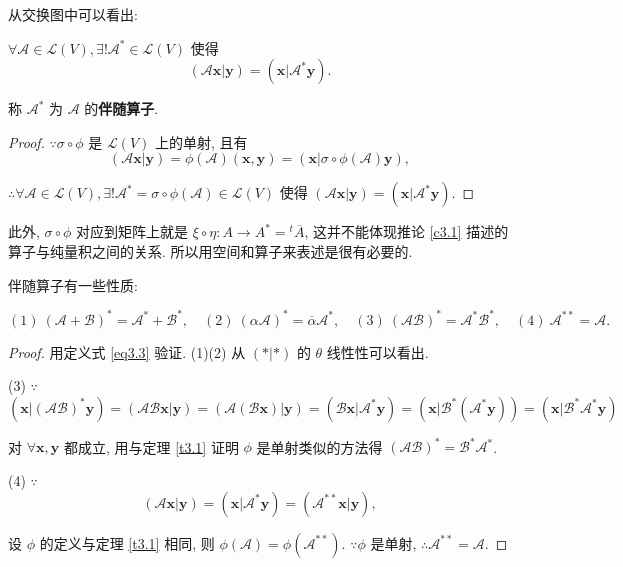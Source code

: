 \documentclass{ctexart}
\begin{document}
从交换图中可以看出:
\begin{corollary}\label{c3.1}
    $\forall\mathcal{A}\in\mathcal{L}(V),\exists!\mathcal{A}^*\in\mathcal{L}(V)$ 使得
    \begin{equation}\label{eq3.3}
        (\mathcal{A}\boldsymbol{x}|\boldsymbol{y})=(\boldsymbol{x}|\mathcal{A}^*\boldsymbol{y}).
    \end{equation}

    称 $\mathcal{A}^*$ 为 $\mathcal{A}$ 的\textbf{伴随算子}.
\end{corollary}
\begin{proof}
    $\because\sigma\circ\phi$ 是 $\mathcal{L}(V)$ 上的单射, 且有
    \[(\mathcal{A}\boldsymbol{x}|\boldsymbol{y})=\phi(\mathcal{A})(\boldsymbol{x},\boldsymbol{y})=(\boldsymbol{x}|\sigma\circ\phi(\mathcal{A})\boldsymbol{y}),\]

    $\therefore\forall\mathcal{A}\in\mathcal{L}(V),\exists!\mathcal{A}^*=\sigma\circ\phi(\mathcal{A})\in\mathcal{L}(V)$ 使得 $(\mathcal{A}\boldsymbol{x}|\boldsymbol{y})=(\boldsymbol{x}|\mathcal{A}^*\boldsymbol{y})$.
\end{proof}
此外, $\sigma\circ\phi$ 对应到矩阵上就是 $\xi\circ\eta:A\to A^*={}^t\overline{A}$, 这并不能体现推论 \ref{c3.1} 描述的算子与纯量积之间的关系. 所以用空间和算子来表述是很有必要的.

伴随算子有一些性质:
\begin{property}
    \[(1)\ (\mathcal{A}+\mathcal{B})^*=\mathcal{A}^*+\mathcal{B}^*,\quad(2)\ (\alpha\mathcal{A})^*=\overline{\alpha}\mathcal{A}^*,\quad(3)\ (\mathcal{A}\mathcal{B})^*=\mathcal{A}^*\mathcal{B}^*,\quad(4)\ \mathcal{A}^{**}=\mathcal{A}.\]
\end{property}
\begin{proof}
    用定义式 \ref{eq3.3} 验证. (1)(2) 从 $(*|*)$ 的 $\theta$ 线性性可以看出.

    (3) $\because$
    \[(\boldsymbol{x}|(\mathcal{A}\mathcal{B})^*\boldsymbol{y})=(\mathcal{A}\mathcal{B}\boldsymbol{x}|\boldsymbol{y})=(\mathcal{A}(\mathcal{B}\boldsymbol{x})|\boldsymbol{y})=(\mathcal{B}\boldsymbol{x}|\mathcal{A}^*\boldsymbol{y})=(\boldsymbol{x}|\mathcal{B}^*(\mathcal{A}^*\boldsymbol{y}))=(\boldsymbol{x}|\mathcal{B}^*\mathcal{A}^*\boldsymbol{y})\]

    对 $\forall\boldsymbol{x},\boldsymbol{y}$ 都成立, 用与定理 \ref{t3.1} 证明 $\phi$ 是单射类似的方法得 $(\mathcal{A}\mathcal{B})^*=\mathcal{B}^*\mathcal{A}^*$.

    (4) $\because$
    \[(\mathcal{A}\boldsymbol{x}|\boldsymbol{y})=(\boldsymbol{x}|\mathcal{A}^*\boldsymbol{y})=(\mathcal{A}^{**}\boldsymbol{x}|\boldsymbol{y}),\]

    设 $\phi$ 的定义与定理 \ref{t3.1} 相同, 则 $\phi(\mathcal{A})=\phi(\mathcal{A}^{**})$. $\because\phi$ 是单射, $\therefore\mathcal{A}^{**}=\mathcal{A}$.
\end{proof}
\end{document}
